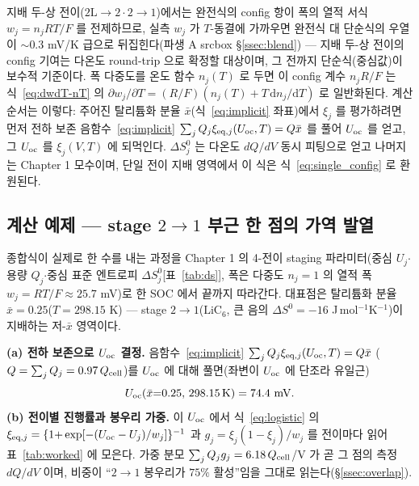 지배 두-상 전이($2\mathrm L\!\to\!2\cdot2\!\to\!1$)에서는 완전식의 config 항이 폭의 열적 서식 $w_j=n_jRT/F$ 를
전제하므로, 실측 $w_j$ 가 $T$-동결에 가까우면 완전식 대 단순식의 우열이 $\sim$0.3 mV/K 급으로 뒤집힌다(파생 A
srcbox \S\ref{ssec:blend}) --- 지배 두-상 전이의 config 기여는 다온도 round-trip 으로 확정할 대상이며, 그
전까지 단순식(중심값)이 보수적 기준이다. 폭 다중도를 온도 함수 $n_j(T)$ 로 두면 이 config 계수 $n_jR/F$ 는
식~\eqref{eq:dwdT-nT} 의 $\partial w_j/\partial T=(R/F)(n_j(T)+T\,\mathrm{d}n_j/\mathrm{d}T)$ 로 일반화된다.
계산 순서는 이렇다: 주어진 탈리튬화 분율 $\bar x$(식~\eqref{eq:implicit} 좌표)에서 $\xi_j$ 를 평가하려면 먼저
전하 보존 음함수~\eqref{eq:implicit} $\sum_j Q_j\xi_{\mathrm{eq},j}(U_{\mathrm{oc}},T)=Q\bar x$ 를 풀어 $U_{\mathrm{oc}}$ 를 얻고, 그
$U_{\mathrm{oc}}$ 를 $\xi_j(V,T)$ 에 되먹인다. $\Delta S^0_j$ 는 다온도 $dQ/dV$ 동시 피팅으로 얻고 나머지는 Chapter 1
모수이며, 단일 전이 지배 영역에서 이 식은 식~\eqref{eq:single_config} 로 환원된다.

\subsection{계산 예제 --- stage $2\!\to\!1$ 부근 한 점의 가역 발열}\label{ssec:worked}
종합식이 실제로 한 수를 내는 과정을 Chapter 1 의 4-전이 staging 파라미터(중심 $U_j$$\cdot$용량 $Q_j$$\cdot$중심
표준 엔트로피 $\Delta S^0_j$[표~\ref{tab:ds}], 폭은 다중도 $n_j{=}1$ 의 열적 폭 $w_j{=}RT/F\!\approx\!25.7$ mV)로
한 SOC 에서 끝까지 따라간다. 대표점은 탈리튬화 분율 $\bar x=0.25$($T=298.15$ K) --- stage
$2\!\to\!1$($\mathrm{LiC_6}$, 큰 음의 $\Delta S^0=-16$ J\,mol$^{-1}$K$^{-1}$)이 지배하는 저-$\bar x$ 영역이다.

\textbf{(a) 전하 보존으로 $U_{\mathrm{oc}}$ 결정.} 음함수~\eqref{eq:implicit} $\sum_jQ_j\xi_{\mathrm{eq},j}(U_{\mathrm{oc}},T)=Q\bar x$
($Q=\sum_jQ_j=0.97\,Q_{\mathrm{cell}}$)를 $U_{\mathrm{oc}}$ 에 대해 풀면(좌변이 $U_{\mathrm{oc}}$ 에 단조라 유일근)
\begin{equation*}
U_\oc(\bar x{=}0.25,\,298.15\,\mathrm K)=74.4\ \mathrm{mV}.
\end{equation*}
\textbf{(b) 전이별 진행률과 봉우리 가중.} 이 $U_{\mathrm{oc}}$ 에서 식~\eqref{eq:logistic} 의
$\xi_{\mathrm{eq},j}=\{1{+}\exp[-(U_{\mathrm{oc}}-U_j)/w_j]\}^{-1}$ 과 $g_j=\xi_j(1-\xi_j)/w_j$ 를 전이마다 읽어 표~\ref{tab:worked}
에 모은다. 가중 분모 $\sum_jQ_jg_j=6.18\,Q_{\mathrm{cell}}$/V 가 곧 그 점의 측정 $dQ/dV$ 이며, 비중이 ``$2\!\to\!1$
봉우리가 $75\%$ 활성''임을 그대로 읽는다(\S\ref{ssec:overlap}).

